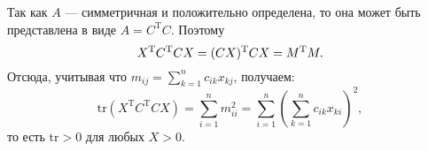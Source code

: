 \documentclass{article}
\begin{document}
Так как $A$ --- симметричная и положительно определена, то она может быть представлена в виде $A=C^{\mathrm{T}}C$. Поэтому
$$
X^{\mathrm{T}}C^{\mathrm{T}}CX=(CX)^{\mathrm{T}}CX=M^{\mathrm{T}}M.\\
$$
Отсюда, учитывая что $m_{ij}=\sum\limits_{k=1}^{n}c_{ik}x_{kj}$, получаем:
$$
\mathrm{tr}(X^{\mathrm{T}}C^{\mathrm{T}}CX)=\sum\limits_{i=1}^{n}m_{ii}^2=\sum\limits_{i=1}^{n}(\sum\limits_{k=1}^{n}c_{ik}x_{ki})^2,
$$
то есть $\mathrm{tr}>0$ для любых $X>0$.
\end{document}
